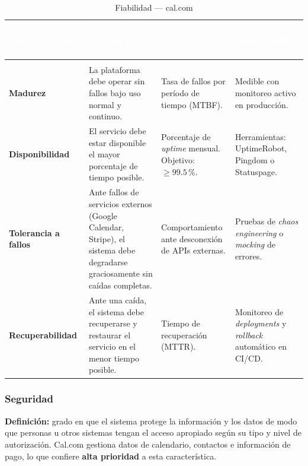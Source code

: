 \documentclass[12pt, a4paper]{article}
\newcommand{\rowpair}{\rowcolor{grisMedio}}
\newcommand{\rowimpar}{\rowcolor{grisClaro}}
\begin{document}
\begin{longtable}{>{\bfseries}p{3cm} p{4.5cm} p{4cm} p{3.5cm}}
\caption{Fiabilidad — cal.com} \label{tab:fiabilidad} \\
\rowcolor{azulClaro}
\textcolor{white}{\textbf{Subcaracterística}} &
\textcolor{white}{\textbf{Descripción aplicada a cal.com}} &
\textcolor{white}{\textbf{Criterio de evaluación}} &
\textcolor{white}{\textbf{Observaciones}} \\
\endfirsthead
\multicolumn{4}{c}{\tablename\ \thetable{} -- continuación} \\
\endhead
\rowpair
Madurez &
La plataforma debe operar sin fallos bajo uso normal y continuo. &
Tasa de fallos por período de tiempo (MTBF). &
Medible con monitoreo activo en producción. \\
\rowimpar
Disponibilidad &
El servicio debe estar disponible el mayor porcentaje de tiempo posible. &
Porcentaje de \textit{uptime} mensual. Objetivo: $\geq 99.5\,\%$. &
Herramientas: UptimeRobot, Pingdom o Statuspage. \\
\rowpair
Tolerancia a fallos &
Ante fallos de servicios externos (Google Calendar, Stripe), el sistema debe degradarse
graciosamente sin caídas completas. &
Comportamiento ante desconexión de APIs externas. &
Pruebas de \textit{chaos engineering} o \textit{mocking} de errores. \\
\rowimpar
Recuperabilidad &
Ante una caída, el sistema debe recuperarse y restaurar el servicio en el menor tiempo
posible. &
Tiempo de recuperación (MTTR). &
Monitoreo de \textit{deployments} y \textit{rollback} automático en CI/CD. \\
\end{longtable}

\subsubsection{Seguridad}

\textbf{Definición:} grado en que el sistema protege la información y los datos de modo
que personas u otros sistemas tengan el acceso apropiado según su tipo y nivel de
autorización. Cal.com gestiona datos de calendario, contactos e información de pago, lo
que confiere \textbf{alta prioridad} a esta característica.
\end{document}
